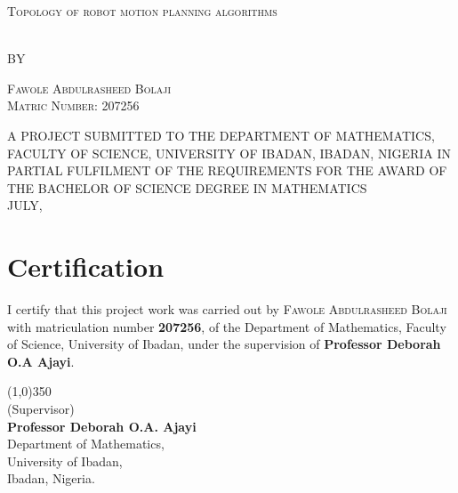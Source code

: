 \documentclass[
    a4paper,%
    12pt,%
    oneside, %
    openany, %
]{report}
\begin{document}
\baselineskip24pt

\thispagestyle{empty}
\thispagestyle{empty}

\begin{center}
    \begin{LARGE}
        \textsc{Topology of robot motion planning algorithms}
    \end{LARGE}
    \\[3em]
    {BY}\\[3em]
    \begin{large}
        \textsc{Fawole Abdulrasheed Bolaji}\\
        \textsc{Matric Number: 207256}\\[4em]
    \end{large}
    A PROJECT SUBMITTED TO THE DEPARTMENT OF MATHEMATICS, FACULTY OF SCIENCE, UNIVERSITY OF IBADAN, IBADAN, NIGERIA IN PARTIAL FULFILMENT OF THE REQUIREMENTS FOR THE AWARD OF THE BACHELOR OF SCIENCE DEGREE IN MATHEMATICS\\[5em]
        
        JULY,
\end{center}

\newpage


\chapter*{Certification}

\renewcommand{\thepage}{\roman{page}}
I certify that this project work was carried out by \textsc{Fawole Abdulrasheed Bolaji} with matriculation number \textbf{207256}, of the Department of Mathematics, Faculty of Science, University of Ibadan, under the supervision of \textbf{Professor Deborah O.A Ajayi}.
\vspace*{3cm}
\begin{center}
    \line(1,0){350}\\
    (Supervisor)\\
    \vspace*{-0.25cm}
    \textbf{Professor Deborah O.A. Ajayi}
    \\
    \vspace*{-0.25cm}
    Department of Mathematics,
    \\
    \vspace*{-0.25cm}
    University of Ibadan,
    \\
    \vspace*{-0.25cm}
    Ibadan, Nigeria.

\end{center}
\newpage
\end{document}
